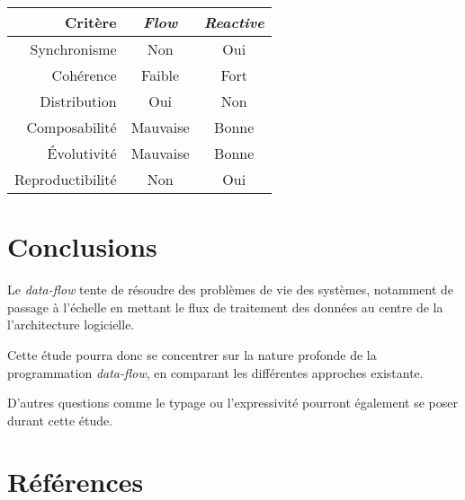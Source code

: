 \documentclass{article}
\begin{document}
\begin{center}
\begin{tabular}{r|c c}
Critère & \emph{Flow} & \emph{Reactive} \\
\hline
Synchronisme & Non & Oui \\
Cohérence & Faible & Fort \\
Distribution & Oui & Non \\
Composabilité & Mauvaise & Bonne \\
Évolutivité & Mauvaise & Bonne \\
Reproductibilité & Non & Oui \\
\end{tabular}
\end{center}

\section{Conclusions}\label{conclusions}

Le \emph{data-flow} tente de résoudre des problèmes de vie des systèmes,
notamment de passage à l'échelle en mettant le flux de traitement des données
au centre de la l'architecture logicielle.

Cette étude pourra donc se concentrer sur la nature profonde de la
programmation \emph{data-flow}, en comparant les différentes approches
existante.

D'autres questions comme le typage ou l'expressivité pourront également
se poser durant cette étude.


\section{Références}\label{références}


\end{document}
